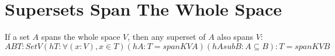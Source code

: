 \section{Supersets Span The Whole Space}

\begin{theorem}
  \label{theorem : superset_span_full}
  \leanok
  If a set $A$ spans the whole space $V$, then any superset of $A$ also spans $V$: ${A B T: Set V} (hT: ∀ (x : V), x \in T)(hA : T = span K V A) (hAsubB : A \subseteq B) :
    T = span K V B$
\end{theorem}
